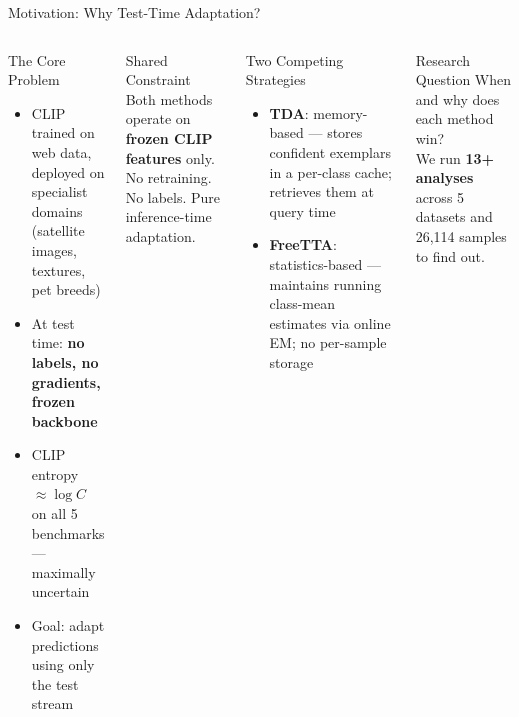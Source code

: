 \documentclass[aspectratio=169,11pt]{beamer}
\begin{document}
\begin{frame}{Motivation: Why Test-Time Adaptation?}
\begin{columns}[T]
  \begin{block}{The Core Problem}
    \begin{itemize}\footnotesize\setlength{\itemsep}{2pt}
      \item CLIP trained on web data, deployed on specialist domains\\
            (satellite images, textures, pet breeds)
      \item At test time: \textbf{no labels, no gradients, frozen backbone}
      \item CLIP entropy $\approx\log C$ on all 5 benchmarks — maximally uncertain
      \item Goal: adapt predictions using only the test stream
    \end{itemize}
  \end{block}
  \vspace{3pt}
  \begin{exampleblock}{\footnotesize Shared Constraint}
    \footnotesize Both methods operate on \textbf{frozen CLIP features} only.\\
    No retraining. No labels. Pure inference-time adaptation.
  \end{exampleblock}
  \begin{block}{Two Competing Strategies}
    \begin{itemize}\footnotesize\setlength{\itemsep}{2pt}
      \item \textbf{TDA}: memory-based — stores confident exemplars in a per-class cache; retrieves them at query time
      \item \textbf{FreeTTA}: statistics-based — maintains running class-mean estimates via online EM; no per-sample storage
    \end{itemize}
  \end{block}
  \vspace{3pt}
  \begin{alertblock}{\footnotesize Research Question}
    \footnotesize When and why does each method win?\\
    We run \textbf{13+ analyses} across 5 datasets and 26,114 samples to find out.
  \end{alertblock}
\end{columns}
\end{frame}
\end{document}
